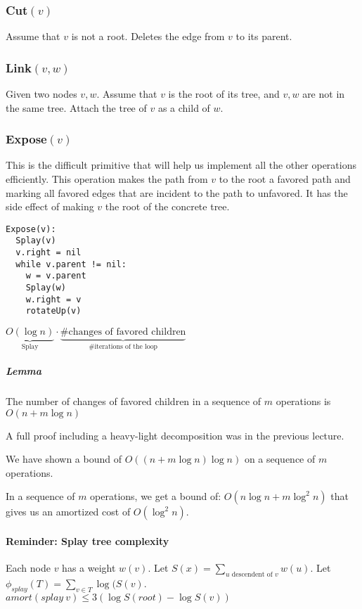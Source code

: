 \documentclass[a4paper]{article}
\begin{document}
\subsubsection{Cut\texorpdfstring{$(v)$}{(v)}}
Assume that $v$ is not a root. Deletes the edge from $v$ to its parent.

\subsubsection{Link\texorpdfstring{$(v,w)$}{(v,w)}}
Given two nodes $v,w$.
Assume that $v$ is the root of its tree, and $v,w$ are not in the same tree.
Attach the tree of $v$ as a child of $w$.

\subsubsection{Expose\texorpdfstring{$(v)$}{(v)}}
This is the difficult primitive that will help us implement all the other operations efficiently. This operation makes the path from $v$ to the root a favored path and marking all favored edges that are incident to the path to unfavored. It has the side effect of making $v$ the root of the concrete tree.

\begin{lstlisting}[frame=L]
Expose(v):
  Splay(v)
  v.right = nil
  while v.parent != nil:
    w = v.parent
    Splay(w)
    w.right = v
    rotateUp(v)
\end{lstlisting}

$\underbrace{O(\log n)}_{\text{Splay}} \cdot \underbrace{\text{\# changes of favored children}}_{\text{\# iterations of the loop}}$

\subparagraph{Lemma}
The number of changes of favored children in a sequence of $m$ operations is $O(n + m \log n)$

A full proof including a heavy-light decomposition was in the previous lecture.

We have shown a bound of $O((n+m\log n) \log n)$ on a sequence of $m$ operations.

In a sequence of $m$ operations, we get a bound of: $O(n\log n + m \log^2 n)$ that gives us an amortized cost of $O(\log^2 n)$.

\paragraph{Reminder: Splay tree complexity}
Each node $v$ has a weight $w(v)$. Let $S(x)=\sum_{\text{$u$ descendent of $v$}} w(u)$.
Let $\phi_{splay}(T)=\sum_{v \in T} \log(S(v)$.
$amort(splay\ v) \le 3(\log S(root) - \log S(v))$
\end{document}
